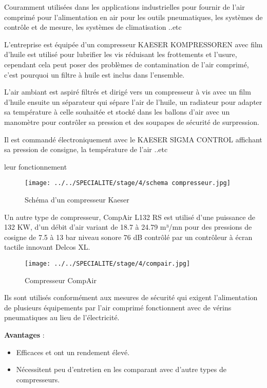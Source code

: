 \documentclass[20pt,a4paper]{report}
\begin{document}
\begin{large}
Couramment utilisées dans les applications industrielles pour fournir de l’air comprimé pour l’alimentation en air pour les outils pneumatiques, les systèmes de contrôle et de mesure, les systèmes de climatisation ..etc

L’entreprise est équipée d’un compresseur KAESER KOMPRESSOREN avec film d’huile est utilisé pour lubrifier les vis réduisant les frottements et l’usure, cependant cela peut poser des problèmes de contamination de l’air comprimé, c’est pourquoi un filtre à huile est inclus dans l’ensemble.

L’air ambiant est aspiré filtrés et dirigé vers un compresseur à vis avec un film d’huile ensuite un séparateur qui sépare l’air de l’huile, un radiateur pour adapter sa température à celle souhaitée et stocké dans les ballons d’air avec un manomètre pour contrôler sa pression et des soupapes de sécurité de surpression.

Il est commandé électroniquement avec le KAESER SIGMA CONTROL affichant sa pression de consigne, la température de l’air ..etc

leur fonctionnement

\begin{figure}[h]
\centering
\texttt{[image: ../../SPECIALITE/stage/4/schema compresseur.jpg]}
\caption{Schéma d'un compresseur Kaeser}
\end{figure}

 
Un autre type de compresseur, CompAir L132 RS est utilisé d’une puissance de 132 KW, d’un débit d’air variant de 18.7 à 24.79 m³/mn pour des pressions de cosigne de 7.5 à 13 bar niveau sonore 76 dB contrôlé par un contrôleur à écran tactile innovant Delcos XL.

\begin{figure}[h]
\centering
\texttt{[image: ../../SPECIALITE/stage/4/compair.jpg]}
\caption{Compresseur CompAir
}
\end{figure}


 
Ils sont utilisés conformément aux mesures de sécurité qui exigent l’alimentation de plusieurs équipements par l’air comprimé fonctionnent avec de vérins pneumatiques au lieu de l’électricité.

\textbf{Avantages} :

\begin{itemize}
	\item Efficaces et ont un rendement élevé.
	
	\item Nécessitent peu d’entretien en les comparant avec d’autre types de compresseurs.
	

\end{itemize}
\end{large}
\end{document}
